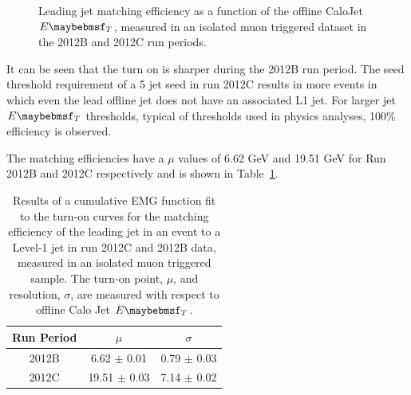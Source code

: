 \begin{figure}[htp]
\centering
{}
\caption[Leading jet matching efficiency as a function of the offline CaloJet $\et$.]{Leading jet matching efficiency as a function of the offline CaloJet $\et$, measured in an isolated muon triggered dataset in the 2012B and 2012C run periods.}
  \label{fig:leadjetmatcheff}
\end{figure}

It can be seen that the turn on is sharper during the 2012B run
period. The seed threshold requirement of a 5 \GeV jet seed in run 2012C results
in more events in which even the lead offline jet does not have an associated L1 jet. For larger jet $\et$
thresholds, typical of thresholds used in physics analyses, 100$\%$ efficiency is observed.

The matching efficiencies have a $\mu$ values of 6.62 GeV and 19.51 GeV for Run 2012B and 2012C respectively and is shown in Table~\ref{tab:matcheff}. 

\begin{table}
\begin{center}
\begin{tabular*}{0.5\textwidth}{c|cc}
\cline{1-3}
\multicolumn{1}{c}{Run Period} & $\mu$ & $\sigma$ \\ \hline\hline
2012B & 6.62 $\pm$ 0.01 & 0.79 $\pm$ 0.03  \\ 
2012C & 19.51 $\pm$ 0.03 & 7.14 $\pm$ 0.02 \\ 
\end{tabular*}
\caption[Results of a cumulative EMG function fit to the turn-on
curves for the matching efficiency of the leading jet in an event to
a Level-1 jet in run 2012C and 2012B data.]{Results of a cumulative EMG function fit to the turn-on
curves for the matching efficiency of the leading jet in an event to
a Level-1 jet in run 2012C and 2012B data, measured in an isolated
muon triggered sample. The turn-on point, $\mu$, and resolution, $\sigma$, are measured with respect to offline Calo Jet $\et$.} \label{tab:matcheff}
\end{center}
\end{table}

